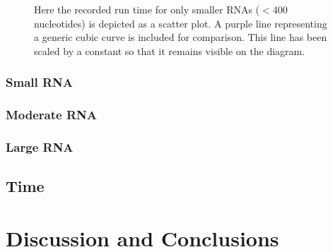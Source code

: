 \documentclass[12pt, a4paper]{article}
\begin{document}
\begin{figure}
\begin{center}
\end{center}
\caption{Here the recorded run time for only smaller RNAs ($< 400$ nucleotides) is depicted as a scatter plot. A purple line representing a generic cubic curve is included for comparison. This line has been scaled by a constant so that it remains visible on the diagram.}
\label{fig:timegraphsmall}
\end{figure}







\subsubsection{Small RNA}
\subsubsection{Moderate RNA}
\subsubsection{Large RNA}
\subsection{Time}

\section{Discussion and Conclusions}






\end{document}
